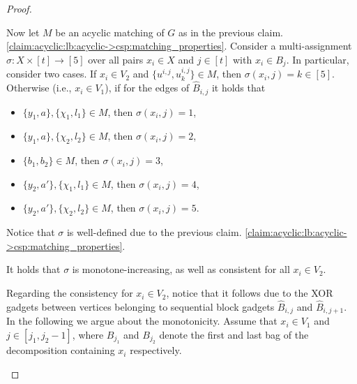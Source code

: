 \begin{proof}
\begin{nestedproof}
            Now let $M$ be an acyclic matching of $G$ as in
            \iflncs
            the previous claim.
            \else
            \cref{claim:acyclic:lb:acyclic->csp:matching_properties}.
            \fi
            Consider a multi-assignment $\sigma \colon X \times [t] \to [5]$ over all pairs $x_i \in X$ and $j \in [t]$
            with $x_i \in B_j$.
            In particular, consider two cases.
            If $x_i \in V_2$ and $\{u^{i,j}, u^{i,j}_k\} \in M$, then $\sigma(x_i,j) = k \in [5]$.
            Otherwise (i.e., $x_i \in V_1$),
            if for the edges of $\hat{B}_{i,j}$ it holds that
            \begin{itemize}
                \item $\{y_1,a\},  \{\chi_1,l_1\} \in M$, then $\sigma(x_i,j) = 1$,
                \item $\{y_1,a\},  \{\chi_2,l_2\} \in M$, then $\sigma(x_i,j) = 2$,
                \item $\{b_1,b_2\} \in M$,                then $\sigma(x_i,j) = 3$,
                \item $\{y_2,a'\}, \{\chi_1,l_1\} \in M$, then $\sigma(x_i,j) = 4$,
                \item $\{y_2,a'\}, \{\chi_2,l_2\} \in M$, then $\sigma(x_i,j) = 5$.
            \end{itemize}
            Notice that $\sigma$ is well-defined due to
            \iflncs
            the previous claim.
            \else
            \cref{claim:acyclic:lb:acyclic->csp:matching_properties}.
            \fi

            \begin{claim}
                It holds that $\sigma$ is monotone-increasing, as well as consistent for all $x_i \in V_2$.
            \end{claim}

            \begin{claimproof}
                Regarding the consistency for $x_i \in V_2$,
                notice that it follows due to the XOR gadgets between vertices belonging to sequential
                block gadgets $\hat{B}_{i,j}$ and $\hat{B}_{i,j+1}$.
                In the following we argue about the monotonicity.
                Assume that $x_i \in V_1$ and $j \in [j_1,j_2-1]$,
                where $B_{j_1}$ and $B_{j_2}$ denote the first and last bag of the decomposition containing $x_i$ respectively.



\end{claimproof}
\end{nestedproof}
\end{proof}
